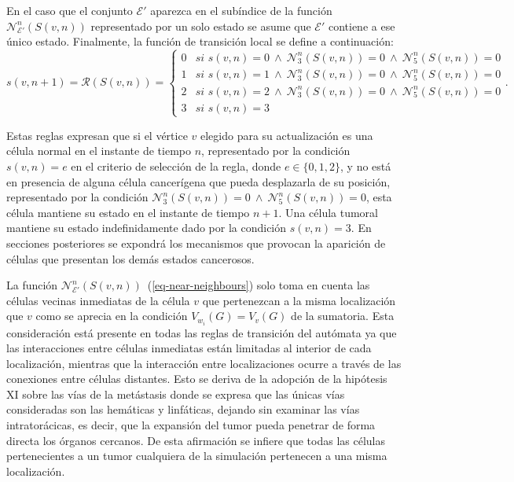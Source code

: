 En el caso que el conjunto $\mathcal{E'}$ aparezca en el sub\'indice de la funci\'on $\mathcal{N}_{\mathcal{E'}}^n(S(v,n))$ representado por un solo estado se asume que $\mathcal{E'}$ contiene a ese \'unico estado. Finalmente, la funci\'on de transici\'on local se define a continuaci\'on:
\begin{equation}
s(v,n+1)=\mathcal{R}(S(v,n))=\left\lbrace
	\begin{array}{ll}
		0& \textit{si } s(v,n)=0~\wedge~\mathcal{N}_3^n(S(v,n))=0~\wedge~\mathcal{N}_5^n(S(v,n))=0 \\
		1& \textit{si } s(v,n)=1~\wedge~\mathcal{N}_3^n(S(v,n))=0~\wedge~\mathcal{N}_5^n(S(v,n))=0 \\
		2& \textit{si } s(v,n)=2~\wedge~\mathcal{N}_3^n(S(v,n))=0~\wedge~\mathcal{N}_5^n(S(v,n))=0 \\
		3& \textit{si } s(v,n)=3 
	\end{array}
\right.. \label{eq-inert}
\end{equation}

Estas reglas expresan que si el v\'ertice $v$ elegido para su actualizaci\'on es una c\'elula normal en el instante de tiempo $n$, representado por la condici\'on $s(v,n)=e$ en el criterio de selecci\'on de la regla, donde $e \in \lbrace 0,1,2 \rbrace$, y no est\'a en presencia de alguna c\'elula cancer\'igena que pueda desplazarla de su posici\'on, representado por la condici\'on $\mathcal{N}_3^n(S(v,n))=0~\wedge~\mathcal{N}_5^n(S(v,n))=0$, esta c\'elula mantiene su estado en el instante de tiempo $n+1$. Una c\'elula tumoral mantiene su estado indefinidamente dado por la condici\'on $s(v,n)=3$. En secciones posteriores se expondr\'a los mecanismos que provocan la aparici\'on de c\'elulas que presentan los dem\'as estados cancerosos.

La funci\'on $\mathcal{N}_{\mathcal{E'}}^n(S(v,n))$~(\ref{eq-near-neighbours}) solo toma en cuenta las c\'elulas vecinas inmediatas de la c\'elula $v$ que pertenezcan a la misma localizaci\'on que $v$ como se aprecia en la condici\'on $V_{w_i}(G)=V_v(G)$ de la sumatoria. Esta consideraci\'on est\'a presente en todas las reglas de transici\'on del aut\'omata ya que las interacciones entre c\'elulas inmediatas est\'an limitadas al interior de cada localizaci\'on, mientras que la interacci\'on entre localizaciones ocurre a trav\'es de las conexiones entre c\'elulas distantes. Esto se deriva de la adopci\'on de la hip\'otesis XI sobre las v\'ias de la met\'astasis donde se expresa que las \'unicas v\'ias consideradas son las hem\'aticas y linf\'aticas, dejando sin examinar las v\'ias intrator\'acicas, es decir, que la expansi\'on del tumor pueda penetrar de forma directa los \'organos cercanos. De esta afirmaci\'on se infiere que todas las c\'elulas pertenecientes a un tumor cualquiera de la simulaci\'on pertenecen a una misma localizaci\'on.